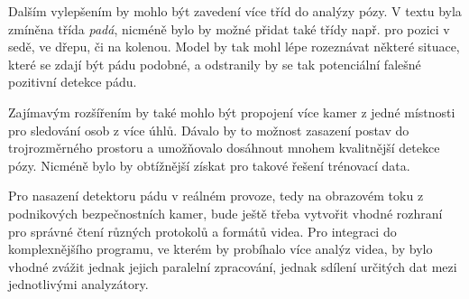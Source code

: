 Dalším vylepšením by mohlo být zavedení více tříd do analýzy pózy. V textu byla
zmíněna třída \textit{padá}, nicméně bylo by možné přidat také třídy např. pro
pozici v sedě, ve dřepu, či na kolenou. Model by tak mohl lépe rozeznávat
některé situace, které se zdají být pádu podobné, a  odstranily by se tak
potenciální falešné pozitivní detekce pádu.

Zajímavým rozšířením by také mohlo být propojení více kamer z jedné místnosti
pro sledování osob z více úhlů. Dávalo by to možnost zasazení postav do
trojrozměrného prostoru a umožňovalo dosáhnout mnohem kvalitnější detekce pózy.
Nicméně bylo by obtížnější získat pro takové řešení trénovací data.

Pro nasazení detektoru pádu v reálném provoze, tedy na obrazovém toku z
podnikových bezpečnostních kamer, bude ještě třeba vytvořit vhodné rozhraní pro
správné čtení různých protokolů a formátů videa. Pro integraci do
komplexnějšího programu, ve kterém by probíhalo více analýz videa, by bylo
vhodné zvážit jednak jejich paralelní zpracování, jednak sdílení určitých dat
mezi jednotlivými analyzátory.

\endinput